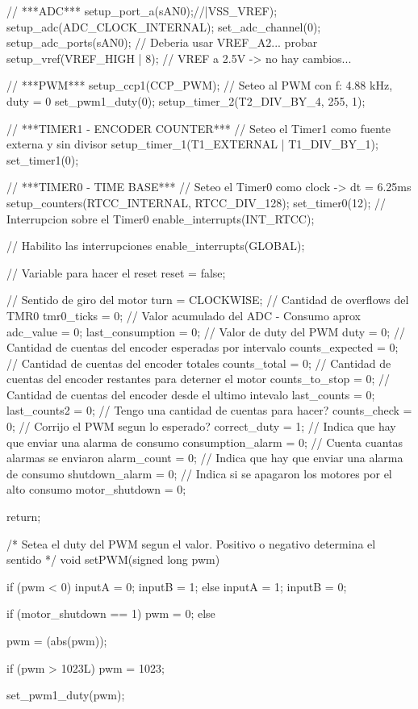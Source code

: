 \documentclass[a4paper,10pt]{article}
\begin{document}
{\begin{verbatimtab}
{	// ***ADC***
	setup_port_a(sAN0);//|VSS_VREF);
	setup_adc(ADC_CLOCK_INTERNAL);
	set_adc_channel(0);
	setup_adc_ports(sAN0);
	// Deberia usar VREF_A2... probar
	setup_vref(VREF_HIGH | 8); // VREF a 2.5V -> no hay cambios...
	
	// ***PWM***
	setup_ccp1(CCP_PWM);
	// Seteo al PWM con f: 4.88 kHz, duty = 0
	set_pwm1_duty(0);
	setup_timer_2(T2_DIV_BY_4, 255, 1);

	// ***TIMER1 - ENCODER COUNTER***
	// Seteo el Timer1 como fuente externa y sin divisor
	setup_timer_1(T1_EXTERNAL | T1_DIV_BY_1);
	set_timer1(0);

	// ***TIMER0 - TIME BASE***
	// Seteo el Timer0 como clock -> dt = 6.25ms
	setup_counters(RTCC_INTERNAL, RTCC_DIV_128);
	set_timer0(12);
	// Interrupcion sobre el Timer0
	enable_interrupts(INT_RTCC);

	// Habilito las interrupciones
	enable_interrupts(GLOBAL);
	
	// Variable para hacer el reset
	reset = false;

	// Sentido de giro del motor
	turn = CLOCKWISE;
	// Cantidad de overflows del TMR0
	tmr0_ticks = 0;
	// Valor acumulado del ADC - Consumo aprox
	adc_value = 0;
	last_consumption = 0;
	// Valor de duty del PWM
	duty = 0;
	// Cantidad de cuentas del encoder esperadas por intervalo
	counts_expected = 0;
	// Cantidad de cuentas del encoder totales
	counts_total = 0;
	// Cantidad de cuentas del encoder restantes para deterner el motor
	counts_to_stop = 0;
	// Cantidad de cuentas del encoder desde el ultimo intevalo
	last_counts = 0;
	last_counts2 = 0;
	// Tengo una cantidad de cuentas para hacer?
	counts_check = 0;
	// Corrijo el PWM segun lo esperado?
	correct_duty = 1;
	// Indica que hay que enviar una alarma de consumo
	consumption_alarm = 0;
	// Cuenta cuantas alarmas se enviaron
	alarm_count = 0;
	// Indica que hay que enviar una alarma de consumo
	shutdown_alarm = 0;
	// Indica si se apagaron los motores por el alto consumo
	motor_shutdown = 0;

	return;	
}	

/* Setea el duty del PWM segun el valor. Positivo o negativo determina el sentido */
void setPWM(signed long pwm)
{
	if (pwm < 0)
	{
		inputA = 0;
		inputB = 1;
	} else {
		inputA = 1;
		inputB = 0;
	}
	
	if (motor_shutdown == 1)
	{
		pwm = 0;
	} else {
		pwm = (abs(pwm));
		
		if (pwm > 1023L)
			pwm = 1023;
	}

	set_pwm1_duty(pwm);
	
}
\end{verbatimtab}}
\end{document}
